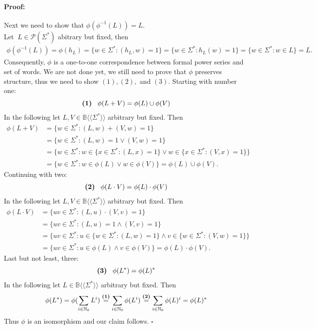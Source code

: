 \documentclass[12pt,letterpaper]{article}
\newenvironment{proof}{\paragraph{Proof:}}{\hfill$\square$}
\newcommand{\fps}[1] {
\mathbb{#1}\langle \langle \Sigma^* \rangle \rangle
}
\begin{document}
\begin{proof}
    Next we need to show that $\phi(\phi^{-1}(L)) = L.$\\
    Let $\ L \in \mathcal{P}(\Sigma^*)$ abitrary but fixed, then
    \begin{align*}
      \phi(\phi^{-1}(L)) = \phi(h_L) = \{w \in \Sigma^* : (h_L,w) = 1 \}
      = \{ w \in \Sigma^* : h_L(w) = 1\} = \{ w \in \Sigma^* : w \in L\} = L.
    \end{align*}
    Consequently, $\phi$ is a one-to-one correspondence between formal power
    series and set of words.
    We are not done yet, we still need to prove that $\phi$ preserves
    structure, thus we need to show $(1), (2),$ and $(3)$. Starting with
    number one:
    \[ \text{\bf (1)} \hspace{0.3cm} \phi(L+V) = \phi(L) \cup \phi(V) \]
    In the following let $L,V \in \fps{B}$ arbitrary but fixed. Then
    \begin{align*}
      \phi(L+V) &= \{ w \in \Sigma^* : (L,w) + (V,w) = 1 \} \\
        &= \{ w \in \Sigma^* : (L,w) = 1 \lor (V,w) = 1 \} \\
        &= \{ w \in \Sigma^* : w \in \{ x \in \Sigma^* : (L,x) = 1 \}
        \lor w \in \{ x \in \Sigma^* :(V,x) = 1 \} \} \\
        &= \{ w \in \Sigma^* : w \in \phi(L) \lor w \in \phi(V) \} 
        = \phi(L) \cup \phi(V).
    \end{align*}
    Continuing with two:
    \[ 
      \text{\bf (2)} \hspace{0.3cm} 
      \phi(L\cdot V) = \phi(L) \cdot \phi(V) 
    \]
    In the following let $L,V \in \fps{B}$ arbitrary but fixed. Then
    \begin{align*}
      \phi(L\cdot V) &= \{ uv \in \Sigma^* : (L,u) \cdot (V,v) = 1\}\\
        &= \{ uv \in \Sigma^* : (L,u) = 1 \land (V,v) = 1\} \\
        &= \{ uv \in \Sigma^* : u \in \{ w \in \Sigma^* : (L,w) = 1\}
          \land v \in \{ w \in \Sigma^* : (V,w) = 1\}
        \} \\
        &= \{ uv \in \Sigma^* : u \in \phi(L)
          \land v \in \phi(V)
        \} = \phi(L) \cdot \phi(V).
    \end{align*}
    Last but not least, three:
    \[ 
      \text{\bf (3)} \hspace{0.3cm} 
      \phi(L^*) = \phi(L)^*
    \]
    In the following let $L \in \fps{B}$ arbitrary but fixed. Then
    \begin{align*}
      \phi(L^*) = \phi(\sum_{i\in \mathbb{N}_0} L^i) 
      \stackrel{\text{\bf (1)}}{=} \sum_{i\in \mathbb{N}_0} \phi(L^i)
      \stackrel{\text{\bf (2)}}{=} \sum_{i\in \mathbb{N}_0} \phi(L)^i
      = \phi(L)^*
    \end{align*}
    Thus $\phi$ is an isomorphism and our claim follows.
\end{proof}
\end{document}
